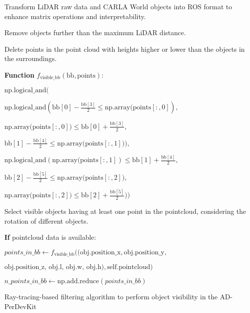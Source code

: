 \begin{algorithm}[H]
	\SetAlgoLined
	\footnotesize
	
	
	\BlankLine
	
	Transform \ac{LiDAR} raw data and \ac{CARLA} World objects into \ac{ROS} format to enhance matrix operations and interpretability.
	
	\BlankLine
	
	Remove objects further than the maximum \ac{LiDAR} distance.
	
	\BlankLine
	
	Delete points in the point cloud with heights higher or lower than the objects in the surroundings.
	
	\textbf{Function} $f_{\text{visible\_bb}}(\text{bb}, \text{points})$:
	
	\Indp
	\Return $\text{np.logical\_and}($
	
	\hspace{3em} $\text{np.logical\_and}(\text{bb}[0] - \frac{\text{bb}[3]}{2} \leq \text{np.array(points}[:,0]),$
	
	\hspace{3em} $\text{np.array(points}[:,0]) \leq \text{bb}[0] + \frac{\text{bb}[3]}{2},$
	
	\hspace{3em} $\text{bb}[1] - \frac{\text{bb}[4]}{2} \leq \text{np.array(points}[:,1])), $
	
	\hspace{3em} $\text{np.logical\_and}(\text{np.array(points}[:,1]) \leq \text{bb}[1] + \frac{\text{bb}[4]}{2},$
	
	\hspace{3em} $\text{bb}[2] - \frac{\text{bb}[5]}{2} \leq \text{np.array(points}[:,2]),$
	
	\hspace{3em} $\text{np.array(points}[:,2]) \leq \text{bb}[2] + \frac{\text{bb}[5]}{2}))$
	
	\Indm
	
	\BlankLine
	
	Select visible objects having at least one point in the pointcloud, considering the rotation of different objects.
	
	\BlankLine
	
	\textbf{If} pointcloud data is available:
	
	\Indp
	$points\_in\_bb \gets f_{\text{visible\_bb}}((\text{obj.position\_x}, \text{obj.position\_y},$
	
	\hspace{9.5em} $\text{obj.position\_z, obj.l, obj.w, obj.h}), \text{self.pointcloud})$
	
	$n\_points\_in\_bb \gets \text{np.add.reduce}(points\_in\_bb)$
	
	\Indm
	
	\BlankLine
	
	\caption{Ray-tracing-based filtering algorithm to perform object visibility in the \ac{AD-PerDevKit}}
	\label{alg:8_ray_tracing_object_visibility}
\end{algorithm}

